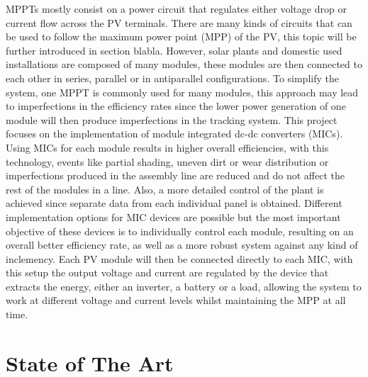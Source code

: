 
MPPTs mostly consist on a power circuit that regulates either voltage drop or current flow across the PV terminals. There are many kinds of circuits that can be used to follow the maximum power point (MPP) of the PV, this topic will be further introduced in section blabla. 
However, solar plants and domestic used installations are composed of many modules, these modules are then connected to each other in series, parallel or in antiparallel configurations. To simplify the system, one MPPT is commonly used for many modules, this approach may lead to imperfections in the efficiency rates since the lower power generation of one module will then produce imperfections in the tracking system. 
This project focuses on the implementation of module integrated dc-dc converters (MICs). Using MICs for each module results in higher overall efficiencies, with this technology, events like partial shading, uneven dirt or wear distribution or imperfections produced in the assembly line are reduced and do not affect the rest of the modules in a line. Also, a more detailed control of the plant is achieved since separate data from each individual panel is obtained.
Different implementation options for MIC devices are possible but the most important objective of these devices is to individually control each module, resulting on an overall better efficiency rate, as well as a more robust system against any kind of inclemency. Each PV module will then be connected directly to each MIC, with this setup the output voltage and current are regulated by the device that extracts the energy, either an inverter, a battery or a load, allowing the system to work at different voltage and current levels whilst maintaining the MPP at all time.

\section{State of The Art}




